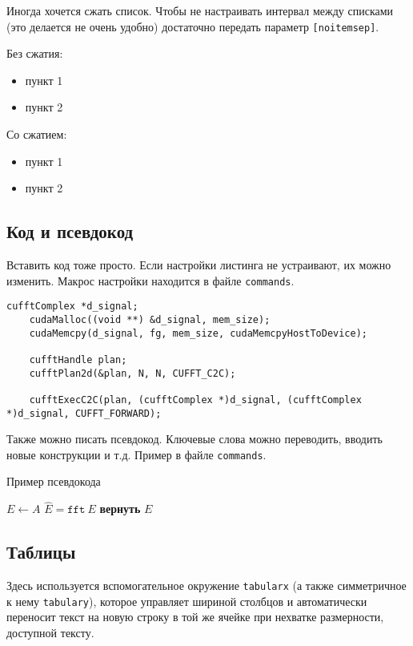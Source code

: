 Иногда хочется сжать список. Чтобы не настраивать интервал между списками (это делается не очень удобно) достаточно передать параметр \texttt{[noitemsep]}.

Без сжатия:
\begin{itemize}
    \item пункт 1
    \item пункт 2
\end{itemize}

Со сжатием:
\begin{itemize}[noitemsep]
    \item пункт 1
    \item пункт 2
\end{itemize}

\subsection{Код и псевдокод}
Вставить код тоже просто. Если настройки листинга не устраивают, их можно изменить. Макрос настройки находится в файле \texttt{commands}.

\begin{lstlisting}[caption={Пример вызова БПФ в библиотеке \texttt{CuFFT}}]
	cufftComplex *d_signal;
	cudaMalloc((void **) &d_signal, mem_size); 
	cudaMemcpy(d_signal, fg, mem_size, cudaMemcpyHostToDevice);
	
	cufftHandle plan;
	cufftPlan2d(&plan, N, N, CUFFT_C2C);
	
	cufftExecC2C(plan, (cufftComplex *)d_signal, (cufftComplex *)d_signal, CUFFT_FORWARD);
\end{lstlisting}

Также можно писать псевдокод. Ключевые слова можно переводить, вводить новые конструкции и т.д. Пример в файле \texttt{commands}.
\begin{algorithm}[H]
    \caption{Пример псевдокода}
    \begin{algorithmic}[1] %
        \State $E \gets A$
        \State $\hat{E} = \texttt{fft}~E$
        \EndFor
        \State \textbf{вернуть} $E$
        \EndProcedure
    \end{algorithmic}
\end{algorithm}

\subsection{Таблицы}
Здесь используется вспомогательное окружение \texttt{tabularx} (а также симметричное к нему \texttt{tabulary}), которое управляет шириной столбцов и автоматически переносит текст на новую строку в той же ячейке при нехватке размерности, доступной тексту.

